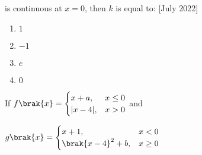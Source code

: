     is continuous at $x=0$, then $k$ is equal to: \hfill{[July 2022]}
    \begin{multicols}{2}
        \begin{enumerate}
            \item $1$
            \item $-1$
            \item$e$
            \item $0$
            
        \end{enumerate}
    \end{multicols}
    \item If $ f\brak{x} =
        \begin{cases}
            x+a , &x \leq 0 \\
            |x-4|, &x > 0
        \end{cases} $ 
        and
        
        $ g\brak{x} = 
        \begin{cases}
            x+1 , &x<0 \\
            \brak{x-4}^2 + b,&x\geq 0
        \end{cases}
        $
    

